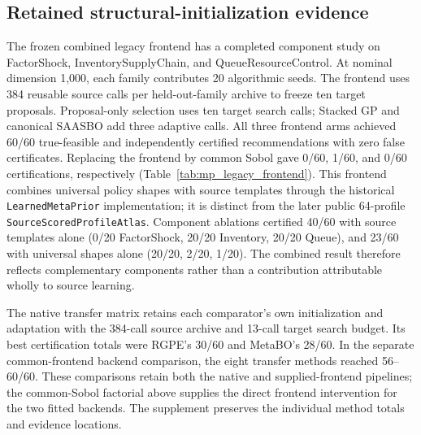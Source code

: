 \subsection{Retained structural-initialization evidence}\label{sec:mp_legacy_frontend}

The frozen combined legacy frontend has a completed component study on
FactorShock, InventorySupplyChain, and QueueResourceControl.  At nominal
dimension 1,000, each family contributes 20 algorithmic seeds.  The frontend
uses 384 reusable source calls per held-out-family archive to freeze ten
target proposals.  Proposal-only selection uses ten target search calls;
Stacked GP and canonical SAASBO add three adaptive calls.  All three frontend
arms achieved 60/60 true-feasible and independently certified recommendations
with zero false certificates.  Replacing the frontend by common Sobol gave
0/60, 1/60, and 0/60 certifications, respectively
(Table~\ref{tab:mp_legacy_frontend}).
This frontend combines universal policy shapes with source templates through
the historical \texttt{LearnedMetaPrior} implementation; it is distinct from
the later public 64-profile \texttt{SourceScoredProfileAtlas}.  Component
ablations certified 40/60 with source templates alone (0/20 FactorShock,
20/20 Inventory, 20/20 Queue), and 23/60 with universal shapes alone
(20/20, 2/20, 1/20).  The combined result therefore reflects complementary
components rather than a contribution attributable wholly to source learning.

\begin{table}[htbp]
\centering
\small
\caption{Historical frontend component study. Source calls are per reusable
archive and search calls are per target run; terminal verification calls are
additional and separately recorded. These results use the common historical
v69 Gaussian terminal protocol, not the current physical-Inventory verifier.}
\label{tab:mp_legacy_frontend}
\resizebox{\textwidth}{!}{}
\end{table}

The native transfer matrix retains each comparator's own initialization and
adaptation with the 384-call source archive and 13-call target search budget.
Its best certification totals were RGPE's 30/60 and MetaBO's 28/60.  In the
separate common-frontend backend comparison, the eight transfer methods reached
56--60/60.  These comparisons retain both the native and supplied-frontend
pipelines; the common-Sobol factorial above supplies the direct frontend
intervention for the two fitted backends.  The supplement preserves the
individual method totals and evidence locations.

